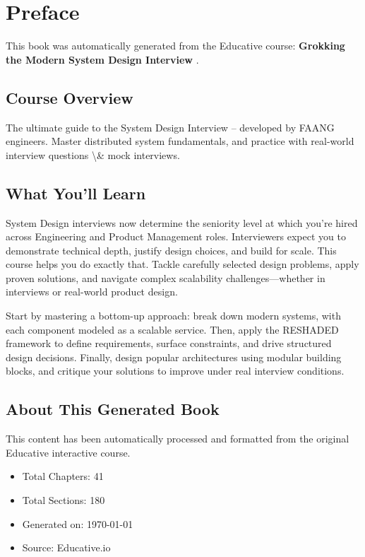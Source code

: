 \documentclass[../Main.tex]{subfiles}
\begin{document}
\chapter*{Preface}

This book was automatically generated from the Educative course: \textbf{ Grokking the Modern System Design Interview }.

\section*{Course Overview}
The ultimate guide to the System Design Interview – developed by FAANG engineers. Master distributed system fundamentals, and practice with real-world interview questions \textbackslash{}& mock interviews.

\section*{What You'll Learn}
System Design interviews now determine the seniority level at which you’re hired across Engineering and Product Management roles. Interviewers expect you to demonstrate technical depth, justify design choices, and build for scale. This course helps you do exactly that. Tackle carefully selected design problems, apply proven solutions, and navigate complex scalability challenges—whether in interviews or real-world product design.

Start by mastering a bottom-up approach: break down modern systems, with each component modeled as a scalable service. Then, apply the RESHADED framework to define requirements, surface constraints, and drive structured design decisions. Finally, design popular architectures using modular building blocks, and critique your solutions to improve under real interview conditions.

\section*{About This Generated Book}
This content has been automatically processed and formatted from the original Educative interactive course. 

\begin{itemize}
    \item Total Chapters: 41
    \item Total Sections: 180
    \item Generated on: \today
    \item Source: Educative.io
\end{itemize}
\end{document}
